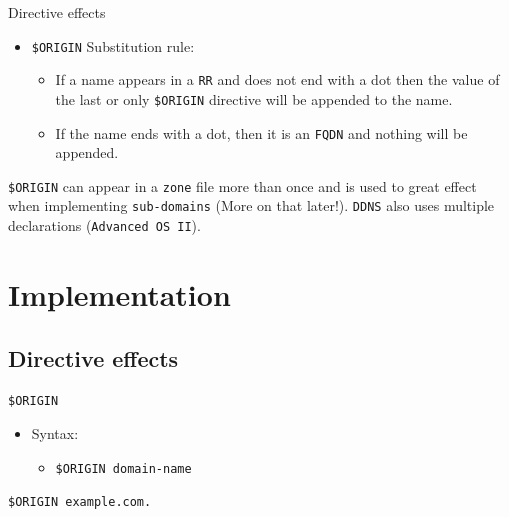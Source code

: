 \documentclass[aspectratio=169,xcolor=table]{beamer}
\begin{document}
\begin{frame}{Directive effects}
  \begin{itemize}
    \item \texttt{\$ORIGIN} Substitution rule:
      \begin{itemize}
        \item If a name appears in a \texttt{RR} and does not end with a dot then the value of the last or only \texttt{\$ORIGIN} directive will be appended to the name.
        \item If the name ends with a dot, then it is an \texttt{FQDN} and nothing will be appended.
      \end{itemize}
  \end{itemize}
  \begin{tcolorbox}[title={\textbf{NOTE:}}]
    \texttt{\$ORIGIN} can appear in a \texttt{zone} file more than once and is used to great effect when implementing \texttt{sub-domains} (More on that later!). \texttt{DDNS} also uses multiple declarations (\texttt{Advanced OS II}). 
  \end{tcolorbox}
\end{frame}

\section{Implementation}
\subsection{Directive effects}
\begin{frame}{\texttt{\$ORIGIN}}
  \begin{itemize}
    \item Syntax:
      \begin{itemize}
        \item \texttt{\$ORIGIN domain-name}
      \end{itemize}
  \end{itemize}
  \begin{tcolorbox}
    \begin{center}
      \texttt{\$ORIGIN example.com.}      
    \end{center}
  \end{tcolorbox}
\end{frame}
\end{document}
